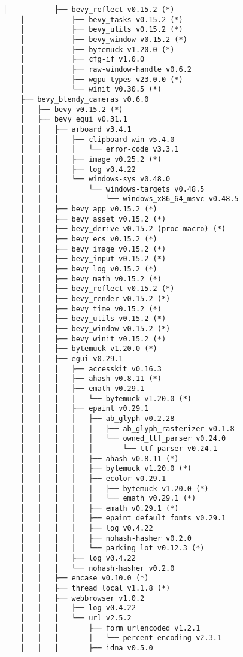 \begin{lstlisting}[style=mystyle, caption={dependencias del proyecto}, label={lst:dependencias}]
    │           ├── bevy_reflect v0.15.2 (*)
    │           ├── bevy_tasks v0.15.2 (*)
    │           ├── bevy_utils v0.15.2 (*)
    │           ├── bevy_window v0.15.2 (*)
    │           ├── bytemuck v1.20.0 (*)
    │           ├── cfg-if v1.0.0
    │           ├── raw-window-handle v0.6.2
    │           ├── wgpu-types v23.0.0 (*)
    │           └── winit v0.30.5 (*)
    ├── bevy_blendy_cameras v0.6.0
    │   ├── bevy v0.15.2 (*)
    │   ├── bevy_egui v0.31.1
    │   │   ├── arboard v3.4.1
    │   │   │   ├── clipboard-win v5.4.0
    │   │   │   │   └── error-code v3.3.1
    │   │   │   ├── image v0.25.2 (*)
    │   │   │   ├── log v0.4.22
    │   │   │   └── windows-sys v0.48.0
    │   │   │       └── windows-targets v0.48.5
    │   │   │           └── windows_x86_64_msvc v0.48.5
    │   │   ├── bevy_app v0.15.2 (*)
    │   │   ├── bevy_asset v0.15.2 (*)
    │   │   ├── bevy_derive v0.15.2 (proc-macro) (*)
    │   │   ├── bevy_ecs v0.15.2 (*)
    │   │   ├── bevy_image v0.15.2 (*)
    │   │   ├── bevy_input v0.15.2 (*)
    │   │   ├── bevy_log v0.15.2 (*)
    │   │   ├── bevy_math v0.15.2 (*)
    │   │   ├── bevy_reflect v0.15.2 (*)
    │   │   ├── bevy_render v0.15.2 (*)
    │   │   ├── bevy_time v0.15.2 (*)
    │   │   ├── bevy_utils v0.15.2 (*)
    │   │   ├── bevy_window v0.15.2 (*)
    │   │   ├── bevy_winit v0.15.2 (*)
    │   │   ├── bytemuck v1.20.0 (*)
    │   │   ├── egui v0.29.1
    │   │   │   ├── accesskit v0.16.3
    │   │   │   ├── ahash v0.8.11 (*)
    │   │   │   ├── emath v0.29.1
    │   │   │   │   └── bytemuck v1.20.0 (*)
    │   │   │   ├── epaint v0.29.1
    │   │   │   │   ├── ab_glyph v0.2.28
    │   │   │   │   │   ├── ab_glyph_rasterizer v0.1.8
    │   │   │   │   │   └── owned_ttf_parser v0.24.0
    │   │   │   │   │       └── ttf-parser v0.24.1
    │   │   │   │   ├── ahash v0.8.11 (*)
    │   │   │   │   ├── bytemuck v1.20.0 (*)
    │   │   │   │   ├── ecolor v0.29.1
    │   │   │   │   │   ├── bytemuck v1.20.0 (*)
    │   │   │   │   │   └── emath v0.29.1 (*)
    │   │   │   │   ├── emath v0.29.1 (*)
    │   │   │   │   ├── epaint_default_fonts v0.29.1
    │   │   │   │   ├── log v0.4.22
    │   │   │   │   ├── nohash-hasher v0.2.0
    │   │   │   │   └── parking_lot v0.12.3 (*)
    │   │   │   ├── log v0.4.22
    │   │   │   └── nohash-hasher v0.2.0
    │   │   ├── encase v0.10.0 (*)
    │   │   ├── thread_local v1.1.8 (*)
    │   │   ├── webbrowser v1.0.2
    │   │   │   ├── log v0.4.22
    │   │   │   └── url v2.5.2
    │   │   │       ├── form_urlencoded v1.2.1
    │   │   │       │   └── percent-encoding v2.3.1
    │   │   │       ├── idna v0.5.0

\end{lstlisting}

